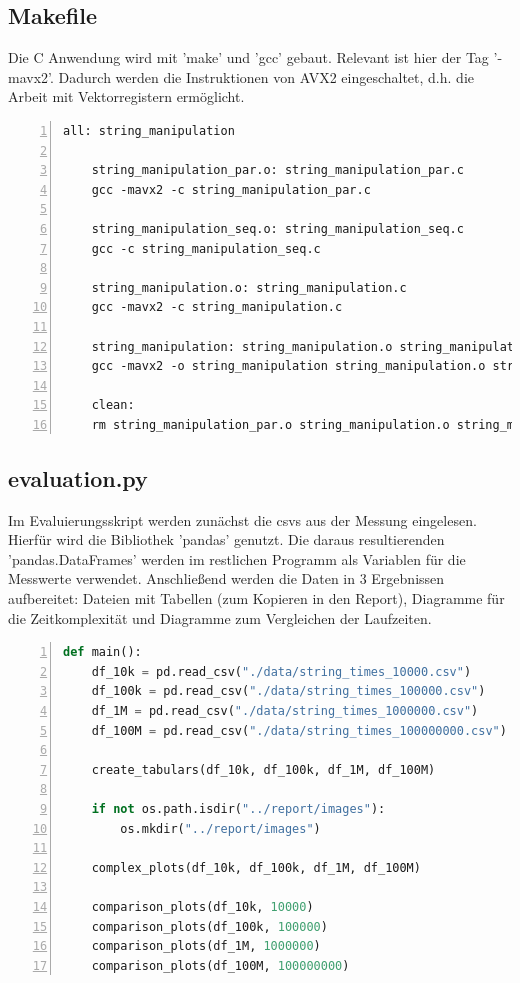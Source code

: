 \documentclass[plainarticle,zihtitle,german,final,hyperref,utf8]{zihpub}
\begin{document}
\subsection{Makefile}
Die C Anwendung wird mit 'make' und 'gcc' gebaut. Relevant ist hier der Tag '-mavx2'. Dadurch werden die Instruktionen von AVX2 eingeschaltet, d.h. die Arbeit mit Vektorregistern ermöglicht.
\begin{lstlisting}[numbers=left]
	all: string_manipulation
	
	string_manipulation_par.o: string_manipulation_par.c
	gcc -mavx2 -c string_manipulation_par.c
	
	string_manipulation_seq.o: string_manipulation_seq.c
	gcc -c string_manipulation_seq.c
	
	string_manipulation.o: string_manipulation.c
	gcc -mavx2 -c string_manipulation.c
	
	string_manipulation: string_manipulation.o string_manipulation_par.o string_manipulation_seq.o
	gcc -mavx2 -o string_manipulation string_manipulation.o string_manipulation_seq.o string_manipulation_par.o
	
	clean:
	rm string_manipulation_par.o string_manipulation.o string_manipulation_seq.o string_manipulation
\end{lstlisting}

\subsection{evaluation.py}\label{subsec:eval}
Im Evaluierungsskript werden zunächst die csvs aus der Messung eingelesen. Hierfür wird die Bibliothek 'pandas' genutzt. Die daraus resultierenden 'pandas.DataFrames' werden im restlichen Programm als Variablen für die Messwerte verwendet.
Anschließend werden die Daten in 3 Ergebnissen aufbereitet: Dateien mit Tabellen (zum Kopieren in den Report), Diagramme für die Zeitkomplexität und Diagramme zum Vergleichen der Laufzeiten.

\begin{lstlisting}[language=python, numbers=left]
def main():
	df_10k = pd.read_csv("./data/string_times_10000.csv")
	df_100k = pd.read_csv("./data/string_times_100000.csv")
	df_1M = pd.read_csv("./data/string_times_1000000.csv")
	df_100M = pd.read_csv("./data/string_times_100000000.csv")

	create_tabulars(df_10k, df_100k, df_1M, df_100M)

	if not os.path.isdir("../report/images"):
		os.mkdir("../report/images")

	complex_plots(df_10k, df_100k, df_1M, df_100M)

	comparison_plots(df_10k, 10000)
	comparison_plots(df_100k, 100000)
	comparison_plots(df_1M, 1000000)
	comparison_plots(df_100M, 100000000)
\end{lstlisting}
\end{document}
